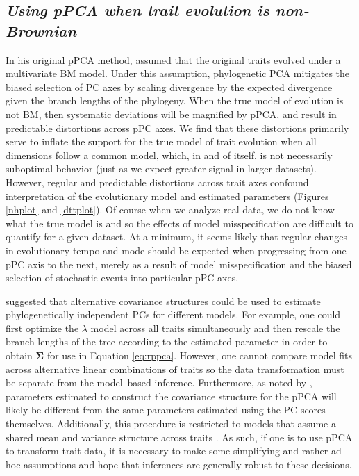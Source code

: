 \documentclass[a4paper,12pt]{article}
\begin{document}
\subsection{\emph{Using pPCA when trait evolution is non-Brownian}}
In his original pPCA method, \citet{Revell2008} assumed that the original traits evolved under a multivariate BM model. Under this assumption, phylogenetic PCA mitigates the biased selection of PC axes by scaling divergence by the expected divergence given the branch lengths of the phylogeny. When the true model of evolution is not BM, then systematic deviations will be magnified by pPCA, and result in predictable distortions across pPC axes. We find that these distortions primarily serve to inflate the support for the true model of trait evolution when all dimensions follow a common model, which, in and of itself, is not necessarily suboptimal behavior (just as we expect greater signal in larger datasets). However, regular and predictable distortions across trait axes confound interpretation of the evolutionary model and estimated parameters (Figures \ref{nhplot} and \ref{dttplot}). Of course when we analyze real data, we do not know what the true model is and so the effects of model misspecification are difficult to quantify for a given dataset. At a minimum, it seems likely that regular changes in evolutionary tempo and mode should be expected when progressing from one pPC axis to the next, merely as a result of model misspecification and the biased selection of stochastic events into particular pPC axes.

\cite{Revell2008} suggested that alternative covariance structures could be used to estimate phylogenetically independent PCs for different models. For example, one could first optimize the $\lambda$ model \citep{Pagel1999} across all traits simultaneously and then rescale the branch lengths of the tree according to the estimated parameter in order to obtain $\mathbf{\Sigma}$ for use in Equation \ref{eq:rppca}. However, one cannot compare model fits across alternative linear combinations of traits so the data transformation must be separate from the model--based inference.  Furthermore, as noted by \citet{Revell2008}, parameters estimated to construct the covariance structure for the pPCA will likely be different from the same parameters estimated using the PC scores themselves. Additionally, this procedure is restricted to models that assume a shared mean and variance structure across traits \citep[see][for examples where this does not apply]{Hansen2008, Bartoszek2012}. As such, if one is to use pPCA to transform trait data, it is necessary to make some simplifying and rather ad--hoc assumptions and hope that inferences are generally robust to these decisions.
\end{document}
